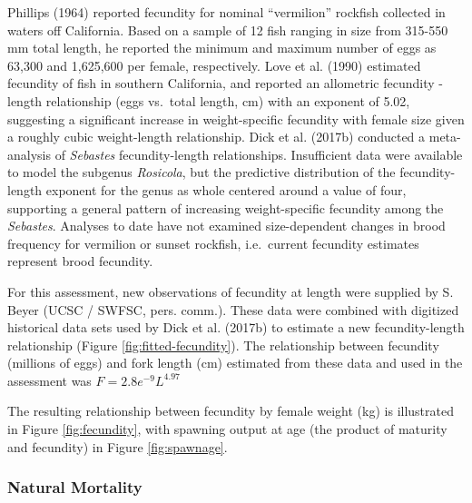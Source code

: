 \documentclass[11pt,
  english,
]{article}
\begin{document}
Phillips {(1964)\leavevmode\tagmcend\tagstructend} reported fecundity for nominal ``vermilion'' rockfish collected in waters off California. Based on a sample of 12 fish ranging in size from 315-550 mm total length, he reported the minimum and maximum number of eggs as 63,300 and 1,625,600 per female, respectively. Love et al. {(1990)\leavevmode\tagmcend\tagstructend} estimated fecundity of fish in southern California, and reported an allometric fecundity - length relationship (eggs vs.~total length, cm) with an exponent of 5.02, suggesting a significant increase in weight-specific fecundity with female size given a roughly cubic weight-length relationship. Dick et al. {(2017b)\leavevmode\tagmcend\tagstructend} conducted a meta-analysis of \emph{Sebastes} fecundity-length relationships. Insufficient data were available to model the subgenus \emph{Rosicola}, but the predictive distribution of the fecundity-length exponent for the genus as whole centered around a value of four, supporting a general pattern of increasing weight-specific fecundity among the \emph{Sebastes}. Analyses to date have not examined size-dependent changes in brood frequency for vermilion or sunset rockfish, i.e.~current fecundity estimates represent brood fecundity.

For this assessment, new observations of fecundity at length were supplied by S. Beyer (UCSC / SWFSC, pers. comm.). These data were combined with digitized historical data sets used by Dick et al. {(2017b)\leavevmode\tagmcend\tagstructend} to estimate a new fecundity-length relationship (Figure \ref{fig:fitted-fecundity}). The relationship between fecundity (millions of eggs) and fork length (cm) estimated from these data and used in the assessment was {\(F = 2.8e^{-9}L^{4.97}\)\leavevmode\tagmcend\tagstructend}

The resulting relationship between fecundity by female weight (kg) is illustrated in Figure \ref{fig:fecundity}, with spawning output at age (the product of maturity and fecundity) in Figure \ref{fig:spawnage}.


\hypertarget{natural-mortality}{%
\subsubsection{Natural Mortality}\label{natural-mortality}}
\end{document}
